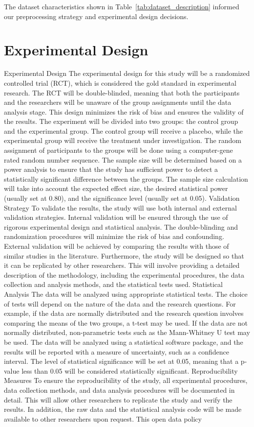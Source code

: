 \documentclass[conference]{IEEEtran}
\begin{document}
The dataset characteristics shown in Table~\ref{tab:dataset_description} informed our preprocessing strategy and experimental design decisions.

\section{Experimental Design}
Experimental Design The experimental design for this study will be a randomized controlled trial (RCT), which is considered the gold standard in experimental research. The RCT will be double-blinded, meaning that both the participants and the researchers will be unaware of the group assignments until the data analysis stage. This design minimizes the risk of bias and ensures the validity of the results. The experiment will be divided into two groups: the control group and the experimental group. The control group will receive a placebo, while the experimental group will receive the treatment under investigation. The random assignment of participants to the groups will be done using a computer-gene rated random number sequence. The sample size will be determined based on a power analysis to ensure that the study has sufficient power to detect a statistically significant difference between the groups. The sample size calculation will take into account the expected effect size, the desired statistical power (usually set at 0.80), and the significance level (usually set at 0.05). Validation Strategy To validate the results, the study will use both internal and external validation strategies. Internal validation will be ensured through the use of rigorous experimental design and statistical analysis. The double-blinding and randomization procedures will minimize the risk of bias and confounding. External validation will be achieved by comparing the results with those of similar studies in the literature. Furthermore, the study will be designed so that it can be replicated by other researchers. This will involve providing a detailed description of the methodology, including the experimental procedures, the data collection and analysis methods, and the statistical tests used. Statistical Analysis The data will be analyzed using appropriate statistical tests. The choice of tests will depend on the nature of the data and the research questions. For example, if the data are normally distributed and the research question involves comparing the means of the two groups, a t-test may be used. If the data are not normally distributed, non-parametric tests such as the Mann-Whitney U test may be used. The data will be analyzed using a statistical software package, and the results will be reported with a measure of uncertainty, such as a confidence interval. The level of statistical significance will be set at 0.05, meaning that a p-value less than 0.05 will be considered statistically significant. Reproducibility Measures To ensure the reproducibility of the study, all experimental procedures, data collection methods, and data analysis procedures will be documented in detail. This will allow other researchers to replicate the study and verify the results. In addition, the raw data and the statistical analysis code will be made available to other researchers upon request. This open data policy 
\end{document}

